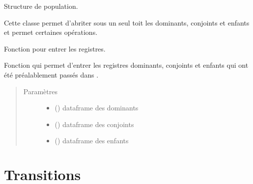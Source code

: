 \documentclass[letterpaper,10pt,french]{sphinxmanual}
\begin{document}

\begin{fulllineitems}
\label{\detokenize{code:simgen.population}}
Structure de population.

Cette classe permet d’abriter sous un seul toit les dominants, conjoints et enfants et permet certaines opérations.

\begin{fulllineitems}
\label{\detokenize{code:simgen.population.input}}
Fonction pour entrer les registres.

Fonction qui permet d’entrer les registres dominants, conjoints et enfants qui ont été préalablement passés dans .
\begin{quote}\begin{description}
\item[{Paramètres}] \leavevmode\begin{itemize}
\item {} 
 () \textendash{} dataframe des dominants

\item {} 
 () \textendash{} dataframe des conjoints

\item {} 
 () \textendash{} dataframe des enfants

\end{itemize}

\end{description}\end{quote}

\end{fulllineitems}


\end{fulllineitems}



\section{Transitions}
\label{\detokenize{code:transitions}}
\end{document}

